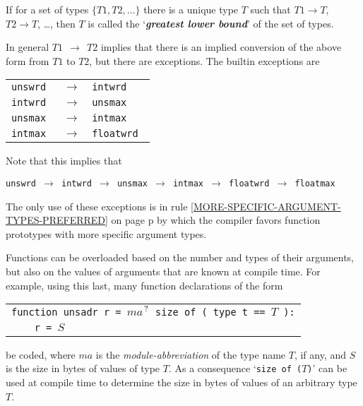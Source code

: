 \documentclass[12pt]{article}
\newcommand{\key}[1]{{\bf \em #1}\index{#1}}
\newcommand{\pagref}[1]{p\pageref{#1}}
\newcommand{\QMARK}{{$^{\,\mbox{\footnotesize ?}}$}}
\newcommand{\TS}{\hspace*{0in}\tt}
\newcommand{\CNV}{\longrightarrow}	%
\begin{document}
If for a set of types $\{T1,T2,\ldots\}$ there is a unique
type $T$ such that $T1\CNV T$, $T2\CNV T$, \ldots{}, then
$T$ is called the `\key{greatest lower bound}'\label{GREATEST-LOWER-BOUND}
of the set of types.

In general $T1~~\CNV~~T2$ implies that there is an implied conversion
of the above form from $T1$ to $T2$, but there are exceptions.
The builtin exceptions
are
\begin{center}
\begin{tabular}{lll}
\tt unswrd	& $\CNV$ & \tt intwrd \\
\tt intwrd	& $\CNV$ & \tt unsmax \\
\tt unsmax	& $\CNV$ & \tt intmax \\
\tt intmax	& $\CNV$ & \tt floatwrd \\
\end{tabular}
\end{center}
Note that this implies that
\begin{center}
\tt unswrd $\CNV$ intwrd $\CNV$ unsmax $\CNV$ intmax
           $\CNV$ floatwrd $\CNV$ floatmax
\end{center}
The only use of these exceptions is in
rule \ref{MORE-SPECIFIC-ARGUMENT-TYPES-PREFERRED}
on page \pagref{MORE-SPECIFIC-ARGUMENT-TYPES-PREFERRED}
by which the compiler favors function prototypes with
more specific argument types.

Functions can be overloaded based on the number and types
of their arguments, but also on the values of arguments that
are known at compile time.  For example, using this last,
many function declarations of the form
\begin{center}
\begin{tabular}{l}
{\tt function unsadr r = $ma$\QMARK{} size of ( type t == $T$ ):} \\
{\TS ~~~~r = $S$}
\end{tabular}
\end{center}
be coded, where $ma$ is the {\em module-abbreviation} of the
type name $T$, if any, and $S$ is the size in bytes of values of type $T$.
As a consequence `{\tt size of ($T$)}' can be used at compile
time to determine the size in bytes of values of an arbitrary type
$T$.
\end{document}

